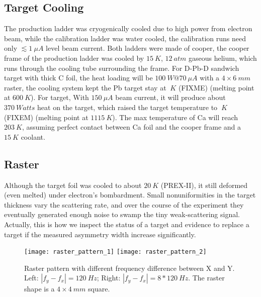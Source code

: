 \subsection{Target Cooling}
The production ladder was cryogenically cooled due to high power from electron beam,
while the calibration ladder was water cooled, the calibration runs need only
$\lesssim 1\ \mu A$ level beam current. Both ladders were made of cooper,
the cooper frame of the production ladder was cooled by $15\ K$, $12\ atm$ gaseous helium, 
which runs through the cooling tube surrounding the frame.
For D-Pb-D sandwich target with thick C foil, the heat loading will be $100\ W@70\ \mu A$
with a $4\times 6 \ mm$ raster, the cooling system kept the Pb target stay at
$\ K$ (FIXME) (melting point at $600 \ K$). For \Ca target, With $150\ \mu A$ beam current, 
it will produce about $370\ Watts$ heat on the target, which raised the target temperature to
$\ K$ (FIXEM) (melting point at $1115\ K$).
The max temperature of Ca will reach $203\ K$, assuming perfect contact between
Ca foil and the cooper frame and a $15\ K$ coolant.



\subsection{Raster}
Although the target foil was cooled to about $20\ K$ (PREX-II), it still deformed (even melted)
under electron's bombardment. Small nonuniformities in the target 
thickness vary the scattering rate, and over the course of the experiment they 
eventually generated enough noise to swamp the tiny weak-scattering signal.
Actually, this is how we inspect the status of a target and evidence to
replace a target if the measured asymmetry width increase significantly.

\begin{figure}
    \centering
    \texttt{[image: raster\_pattern\_1]}
    \texttt{[image: raster\_pattern\_2]}
    \caption{Raster pattern with different frequency difference between X and Y.
    Left: $|f_y - f_x| = 120\ Hz$; Right: $|f_y - f_x| = 8*120\ Hz$. The raster
    shape is a $4\times 4\ mm$ square.} 
    \label{fig:raster_pattern}
\end{figure}

